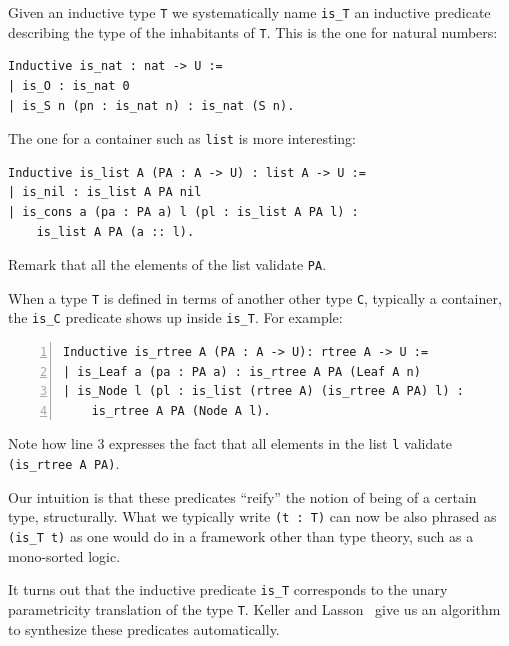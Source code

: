\documentclass[sigplan,10pt,review]{acmart}\settopmatter{printfolios=true,printccs=false,printacmref=false}
\begin{document}
Given an inductive type \lstinline+T+ we systematically name \lstinline+is_T+
an inductive predicate describing the type of the inhabitants of
\lstinline+T+. This is the one for natural numbers:

\begin{minipage}{\textwidth}\begin{lstlisting}
Inductive is_nat : nat -> U :=
| is_O : is_nat 0
| is_S n (pn : is_nat n) : is_nat (S n).
\end{lstlisting}\end{minipage}

\noindent
The one for a container such as \lstinline+list+ is more interesting:

\begin{minipage}{\textwidth}\begin{lstlisting}
Inductive is_list A (PA : A -> U) : list A -> U :=
| is_nil : is_list A PA nil
| is_cons a (pa : PA a) l (pl : is_list A PA l) :
    is_list A PA (a :: l).
\end{lstlisting}\end{minipage}

\noindent
Remark that all the elements of the list validate \lstinline+PA+.

When a type \lstinline+T+ is defined in terms of another other type
\lstinline+C+, typically a container, the \lstinline+is_C+ predicate
shows up inside \lstinline+is_T+. For example:

\begin{minipage}{\textwidth}\begin{lstlisting}[numbers=left]
Inductive is_rtree A (PA : A -> U): rtree A -> U :=
| is_Leaf a (pa : PA a) : is_rtree A PA (Leaf A n)
| is_Node l (pl : is_list (rtree A) (is_rtree A PA) l) :
    is_rtree A PA (Node A l).
\end{lstlisting}\end{minipage}

\noindent
Note how line 3 expresses the fact that all elements in the list
\lstinline+l+ validate \lstinline+(is_rtree A PA)+.

Our intuition is that these predicates ``reify'' the notion of being
of a certain type, structurally. What we typically write \lstinline+(t : T)+
can now be also phrased as \lstinline+(is_T t)+ as one would do in a
framework other than type theory, such as a mono-sorted logic.

It turns out that the inductive predicate \lstinline+is_T+ corresponds
to the unary parametricity translation of the type \lstinline+T+.
Keller and Lasson~\cite{keller:hal-00730913} give us an
algorithm to synthesize these predicates automatically.
\end{document}
